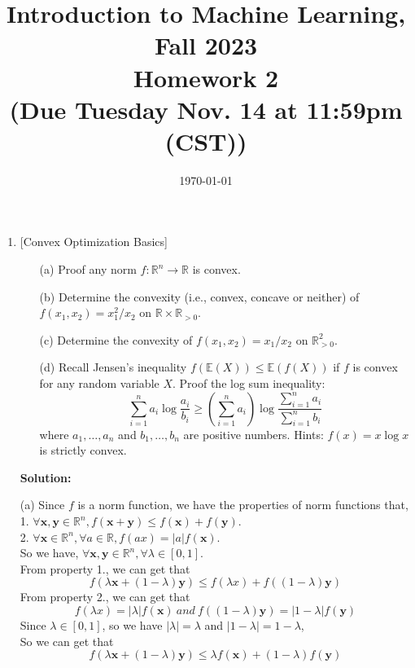 \documentclass[10pt]{article}
\begin{document}
\date{\today}
\title{Introduction to Machine Learning, Fall 2023 \\
	Homework 2\\
	\small (Due Tuesday Nov. 14 at 11:59pm (CST))}
\maketitle

\begin{enumerate}[1.]


	\item {} [Convex Optimization Basics]
	      \begin{itemize}
		      \item[(a)] Proof any norm $f:\mathbb{R}^{n}\rightarrow\mathbb{R}$ is convex.~
		      \item[(b)] Determine the convexity (i.e., convex, concave or neither) of $f(x_1,x_2)=x_1^2/x_2$ on $\mathbb{R}\times\mathbb{R}_{>0}$.~
		      \item[(c)] Determine the convexity of $f(x_1,x_2)=x_1/x_2$ on $\mathbb{R}_{>0}^{2}$.~
			  \item[(d)] Recall Jensen's inequality $f(\mathbb{E}(X)) \leq \mathbb{E}(f(X))$ if $f$ is convex for any random variable $X$. 
			  Proof the log sum inequality: 
			  \[
				\sum_{i=1}^{n} a_i \log \frac{a_i}{b_i} \geq \left( \sum_{i=1}^{n} a_i\right) \log \frac{\sum_{i=1}^{n} a_i}{\sum_{i=1}^{n} b_i} 
			  \]
			  where $a_1,\ldots,a_n$ and $b_1,\ldots,b_n$ are positive numbers. Hints: $f(x)=x\log x$ is strictly convex.~
	      \end{itemize}

		  \textbf{Solution:}

 		  (a) Since $f$ is a norm function, we have the properties of norm functions that,\\
		  1. $\forall \mathbf{x},\mathbf{y}\in \mathbb{R}^{n}, f(\mathbf{x}+\mathbf{y})\leq f(\mathbf{x})+f(\mathbf{y})$.\\
		  2. $\forall \mathbf{x}\in \mathbb{R}^{n}, \forall a \in \mathbb{R}, f(ax)=|a|f(\mathbf{x})$.\\

		  So we have, $\forall \mathbf{x},\mathbf{y}\in \mathbb{R}^{n}, \forall \lambda \in [0,1]$.\\
		  From property 1., we can get that 
		  $$f(\lambda \mathbf{x}+(1-\lambda)\mathbf{y})\leq f(\lambda x)+f((1-\lambda)\mathbf{y})$$
		  From property 2., we can get that
		  $$f(\lambda x)=|\lambda|f(\mathbf{x})\ and\ f((1-\lambda)\mathbf{y})=|1-\lambda|f(\mathbf{y})$$
		  Since $\lambda \in [0,1]$, so we have $|\lambda|=\lambda$ and $|1-\lambda|=1-\lambda$,\\
		  So we can get that
		  $$f(\lambda \mathbf{x}+(1-\lambda)\mathbf{y})\leq \lambda f(\mathbf{x})+(1-\lambda)f(\mathbf{y})$$
		  

\end{enumerate}
\end{document}
